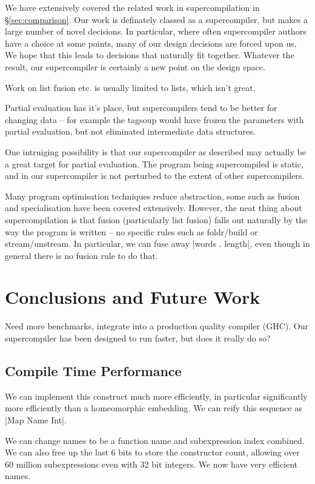 \documentclass[draft]{sigplanconf}
\begin{document}
We have extensively covered the related work in supercompilation in \S\ref{sec:comparison}. Our work is definately classed as a supercompiler, but makes a large number of novel decisions. In particular, where often supercompiler authors have a choice at some points, many of our design decisions are forced upon us. We hope that this leads to decisions that naturally fit together. Whatever the result, our supercompiler is certainly a new point on the design space.

Work on list fusion etc. is usually limited to lists, which isn't great.

Partial evaluation has it's place, but supercompilers tend to be better for changing data -- for example the tagsoup would have frozen the parameters with partial evaluation, but not eliminated intermediate data structures.

One intruiging possibility is that our supercompiler as described may actually be a great target for partial evaluation. The program being supercompiled is static, and in our supercompiler is not perturbed to the extent of other supercompilers.

Many program optimisation techniques reduce abstraction, some such as fusion and specialisation have been covered extensively. However, the neat thing about supercompilation is that fusion (particularly list fusion) falls out naturally by the way the program is written -- no specific rules such as foldr/build or stream/unstream. In particular, we can fuse away |words . length|, even though in general there is no fusion rule to do that.



\section{Conclusions and Future Work}

Need more benchmarks, integrate into a production quality compiler (GHC). Our supercompiler has been designed to run faster, but does it really do so?

\subsection{Compile Time Performance}

We can implement this construct much more efficiently, in particular significantly more efficiently than a homeomorphic embedding. We can reify this sequence as |Map Name Int|.

We can change names to be a function name and subexpression index combined. We can also free up the last 6 bits to store the constructor count, allowing over 60 million subexpressions even with 32 bit integers. We now have very efficient names.
\end{document}
